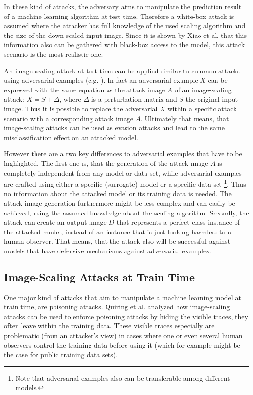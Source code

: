 \documentclass[sigconf]{acmart}
\begin{document}
In these kind of attacks, the adversary aims to manipulate the prediction result of a machine learning algorithm at test time.
Therefore a white-box attack is assumed where the attacker has full knowledge of the used scaling algorithm and the size of the down-scaled input image.
Since it is shown by Xiao et al.\cite{camouflage} that this information also can be gathered with black-box access to the model, this attack scenario is the most realistic one.

An image-scaling attack at test time can be applied similar to common attacks using adversarial examples (e.g. \cite{advexinphys, Papernot2017PracticalBA, brown2018adversarial}).
In fact an adversarial example $X$ can be expressed with the same equation as the attack image $A$ of an image-scaling attack: $X = S + \Delta$, where $\Delta$ is a perturbation matrix and $S$ the original input image.
Thus it is possible to replace the adversarial $X$ within a specific attack scenario with a corresponding attack image $A$.
Ultimately that means, that image-scaling attacks can be used as evasion attacks and lead to the same misclassification effect on an attacked model.

However there are a two key differences to adversarial examples that have to be highlighted.
The first one is, that the generation of the attack image $A$ is completely independent from any model or data set, while adversarial examples are crafted using either a specific (surrogate) model or a specific data set
\footnote{Note that adversarial examples also can be transferable among different models.}.
Thus no information about the attacked model or its training data is needed.
The attack image generation furthermore might be less complex and can easily be achieved, using the assumed knowledge about the scaling algorithm.
Secondly, the attack can create an output image $D$ that represents a perfect class instance of the attacked model, instead of an instance that is just looking harmless to a human observer.
That means, that the attack also will be successful against models that have defensive mechanisms against adversarial examples.

\subsection{Image-Scaling Attacks at Train Time}
\label{sec:traintimeatt}

One major kind of attacks that aim to manipulate a machine learning model at train time, are poisoning attacks.
Quiring et al.\cite{imgscalepoison} analyzed how image-scaling attacks can be used to enforce poisoning attacks by hiding the visible traces, they often leave within the training data.
These visible traces especially are problematic (from an attacker's view) in cases where one or even several human observers control the training data before using it (which for example might be the case for public training data sets).
\end{document}
